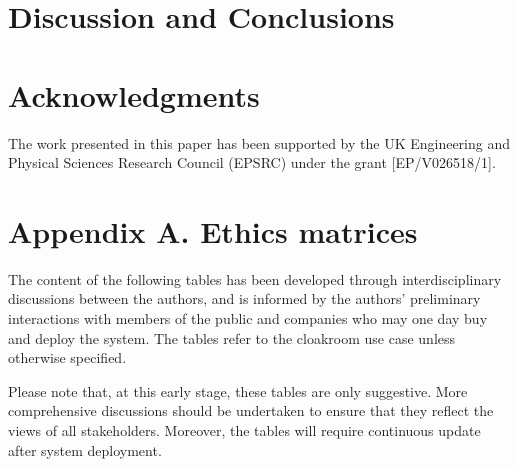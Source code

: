 \documentclass[lettersize,journal]{IEEEtran}
\begin{document}
	
\section{Discussion and Conclusions} \label{discussion-conclusions}

\section*{Acknowledgments}
The work presented in this paper has been supported by the UK Engineering and Physical Sciences Research Council (EPSRC) under the grant [EP/V026518/1].




\appendices
\section*{Appendix A. Ethics matrices} \label{app:ethics-matrices}
The content of the following tables has been developed through interdisciplinary discussions between the authors, and is informed by the authors’ preliminary interactions with members of the public and companies who may one day buy and deploy the system. The tables refer to the cloakroom use case unless otherwise specified. 

Please note that, at this early stage, these tables are only suggestive. More comprehensive discussions should be undertaken to ensure that they reflect the views of all stakeholders. Moreover, the tables will require continuous update after system deployment. 
\end{document}
